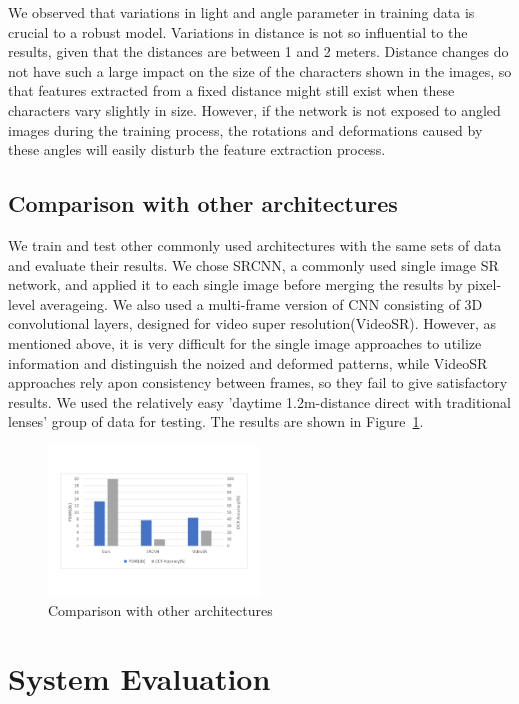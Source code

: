 We observed that variations in light and angle parameter in training data is crucial to a robust model. Variations in distance is not so influential to the results, given that the distances are between 1 and 2 meters. Distance changes do not have such a large impact on the size of the characters shown in the images, so that features extracted from a fixed distance might still exist when these characters vary slightly in size. However, if the network is not exposed to angled images during the training process, the rotations and deformations caused by these angles will easily disturb the feature extraction process.

\subsection{Comparison with other architectures}
We train and test other commonly used architectures with the same sets of data and evaluate their results. We chose SRCNN, a commonly used single image SR network, and applied it to each single image before merging the results by pixel-level averageing. We also used a multi-frame version of CNN consisting of 3D convolutional layers, designed for video super resolution(VideoSR). However, as mentioned above, it is very difficult for the single image approaches to utilize information and distinguish the noized and deformed patterns, while VideoSR approaches rely apon consistency between frames, so they fail to give satisfactory results. We used the relatively easy 'daytime 1.2m-distance direct with traditional lenses' group of data for testing. The results are shown in Figure~\ref{table-comp}.

\begin{figure}
 \centering
    \includegraphics[width=0.5\textwidth]{./pic/table4.pdf}
    \caption{Comparison with other architectures}
    \label{table-comp}
\end{figure}

\section{System Evaluation}
